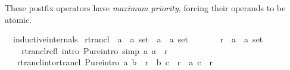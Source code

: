 \begin{isabellebody}
\begin{isamarkuptext}
  These postfix operators have \emph{maximum priority}, forcing their
  operands to be atomic.%
\end{isamarkuptext}\isamarkuptrue%
\isamarkupfalse%
\ \ {\isacharbrackleft}{\kern0pt}{\isacharbrackleft}{\kern0pt}inductive{\isacharunderscore}{\kern0pt}internals{\isacharbrackright}{\kern0pt}{\isacharbrackright}{\kern0pt}\isanewline
{}\isanewline
\isanewline
{}\isamarkupfalse%
\ rtrancl\ {\isacharcolon}{\kern0pt}{\isacharcolon}{\kern0pt}\ {\isachardoublequoteopen}{\isacharparenleft}{\kern0pt}{\isacharprime}{\kern0pt}a\ {\isasymtimes}\ {\isacharprime}{\kern0pt}a{\isacharparenright}{\kern0pt}\ set\ {\isasymRightarrow}\ {\isacharparenleft}{\kern0pt}{\isacharprime}{\kern0pt}a\ {\isasymtimes}\ {\isacharprime}{\kern0pt}a{\isacharparenright}{\kern0pt}\ set{\isachardoublequoteclose}\ \ {\isacharparenleft}{\kern0pt}{\isachardoublequoteopen}{\isacharparenleft}{\kern0pt}{\isacharunderscore}{\kern0pt}\isactrlsup {\isacharasterisk}{\kern0pt}{\isacharparenright}{\kern0pt}{\isachardoublequoteclose}\ {\isacharbrackleft}{\kern0pt}{}{}{}{}{\isacharbrackright}{\kern0pt}\ {}{}{}{\isacharparenright}{\kern0pt}\isanewline
\ \ \ r\ {\isacharcolon}{\kern0pt}{\isacharcolon}{\kern0pt}\ {\isachardoublequoteopen}{\isacharparenleft}{\kern0pt}{\isacharprime}{\kern0pt}a\ {\isasymtimes}\ {\isacharprime}{\kern0pt}a{\isacharparenright}{\kern0pt}\ set{\isachardoublequoteclose}\isanewline
\ \ \isanewline
\ \ \ \ rtrancl{\isacharunderscore}{\kern0pt}refl\ {\isacharbrackleft}{\kern0pt}intro{\isacharbang}{\kern0pt}{\isacharcomma}{\kern0pt}\ Pure{\isachardot}{\kern0pt}intro{\isacharbang}{\kern0pt}{\isacharcomma}{\kern0pt}\ simp{\isacharbrackright}{\kern0pt}{\isacharcolon}{\kern0pt}\ {\isachardoublequoteopen}{\isacharparenleft}{\kern0pt}a{\isacharcomma}{\kern0pt}\ a{\isacharparenright}{\kern0pt}\ {\isasymin}\ r\isactrlsup {\isacharasterisk}{\kern0pt}{\isachardoublequoteclose}\isanewline
\ \ {\isacharbar}{\kern0pt}\ rtrancl{\isacharunderscore}{\kern0pt}into{\isacharunderscore}{\kern0pt}rtrancl\ {\isacharbrackleft}{\kern0pt}Pure{\isachardot}{\kern0pt}intro{\isacharbrackright}{\kern0pt}{\isacharcolon}{\kern0pt}\ {\isachardoublequoteopen}{\isacharparenleft}{\kern0pt}a{\isacharcomma}{\kern0pt}\ b{\isacharparenright}{\kern0pt}\ {\isasymin}\ r\isactrlsup {\isacharasterisk}{\kern0pt}\ {\isasymLongrightarrow}\ {\isacharparenleft}{\kern0pt}b{\isacharcomma}{\kern0pt}\ c{\isacharparenright}{\kern0pt}\ {\isasymin}\ r\ {\isasymLongrightarrow}\ {\isacharparenleft}{\kern0pt}a{\isacharcomma}{\kern0pt}\ c{\isacharparenright}{\kern0pt}\ {\isasymin}\ r\isactrlsup {\isacharasterisk}{\kern0pt}{\isachardoublequoteclose}\isanewline

\end{isabellebody}
